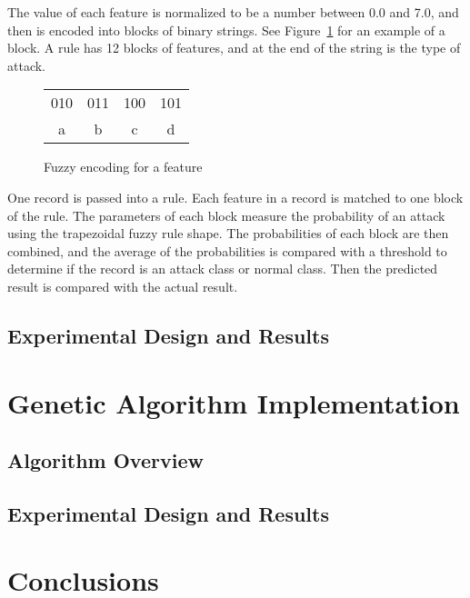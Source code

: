 \documentclass{sig-alternate}
\begin{document}
The value of each feature is normalized to be a number between 0.0 and 7.0, and then is encoded into blocks of binary strings. See Figure~\ref{fig:fuzEncodingForFeature} for an example of a block. A rule has 12 blocks of features, and at the end of the string is the type of attack. 

\begin{figure}
\centering
\caption{Fuzzy encoding for a feature}
\begin{tabular}{|c|c|c|c|} \hline
010 & 011 & 100 & 101\\
a & b & c & d\\
\hline\end{tabular}
\label{fig:fuzEncodingForFeature}
\end{figure}

One record is passed into a rule. Each feature in a record is matched to one block of the rule. The parameters of each block measure the probability of an attack using the trapezoidal fuzzy rule shape. The probabilities of each block are then combined, and the average of the probabilities is compared with a threshold to determine if the record is an attack class or normal class. Then the predicted result is compared with the actual result.




\subsection{Experimental Design and Results}





\section{Genetic Algorithm Implementation}

\subsection{Algorithm Overview}

\subsection{Experimental Design and Results}





\section{Conclusions}
\end{document}
